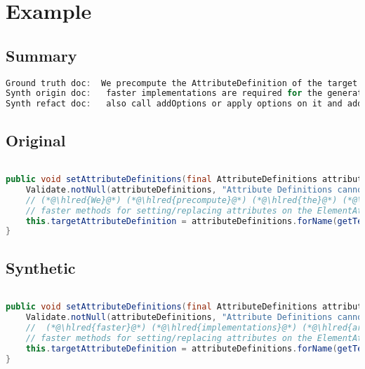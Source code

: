\documentclass[11pt]{article}
\DeclareRobustCommand{\hlred}[1]{{\sethlcolor{YellowOrange}\hl{#1}}}
\begin{document}
\pagebreak
\section{Example}
\subsection{Summary}

\begin{lstlisting}[language=java]
Ground truth doc:  We precompute the AttributeDefinition of the target attribute in order to being able to use much
Synth origin doc:   faster implementations are required for the generation but cannot override or replace attributes instead of just
Synth refact doc:   also call addOptions or apply options on it and addTo instead to implement any
\end{lstlisting}

\subsection{Original}
\begin{lstlisting}[language=java]

public void setAttributeDefinitions(final AttributeDefinitions attributeDefinitions) {
    Validate.notNull(attributeDefinitions, "Attribute Definitions cannot be null");
    // (*@\hlred{We}@*) (*@\hlred{precompute}@*) (*@\hlred{the}@*) (*@\hlred{AttributeDefinition}@*) (*@\hlred{of}@*) the (*@\hlred{target}@*) (*@\hlred{attribute}@*) (*@\hlred{in}@*) (*@\hlred{order}@*) (*@\hlred{to}@*) (*@\hlred{being}@*) (*@\hlred{able}@*) (*@\hlred{to}@*) (*@\hlred{use}@*) (*@\hlred{much}@*)
    // faster methods for setting/replacing attributes on the ElementAttributes implementation
    this.targetAttributeDefinition = attributeDefinitions.forName(getTemplateMode(), this.targetAttrCompleteName);
}
\end{lstlisting}
\subsection{Synthetic}

\begin{lstlisting}[language=java]

public void setAttributeDefinitions(final AttributeDefinitions attributeDefinitions) {
    Validate.notNull(attributeDefinitions, "Attribute Definitions cannot be null");
    //  (*@\hlred{faster}@*) (*@\hlred{implementations}@*) (*@\hlred{are}@*) (*@\hlred{required}@*) (*@\hlred{for}@*) the (*@\hlred{generation}@*) (*@\hlred{but}@*) (*@\hlred{cannot}@*) (*@\hlred{override}@*) (*@\hlred{or}@*) (*@\hlred{replace}@*) (*@\hlred{attributes}@*) (*@\hlred{instead}@*) (*@\hlred{of}@*) (*@\hlred{just}@*)
    // faster methods for setting/replacing attributes on the ElementAttributes implementation
    this.targetAttributeDefinition = attributeDefinitions.forName(getTemplateMode(), this.targetAttrCompleteName);
}
\end{lstlisting}
\end{document}
